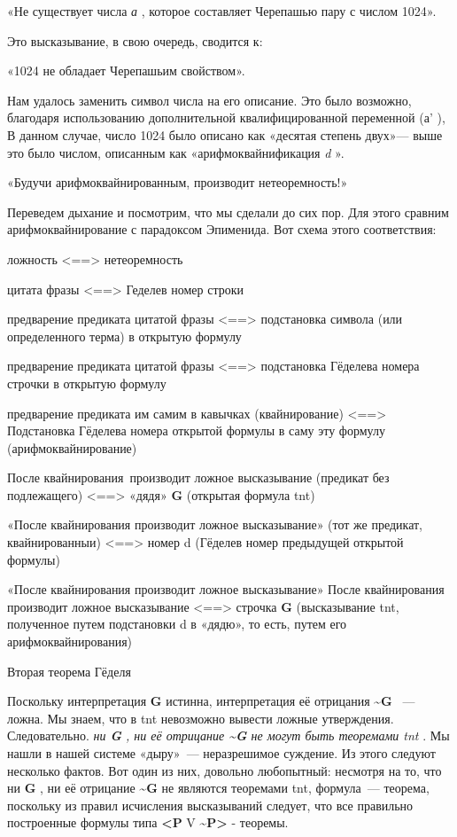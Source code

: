 \documentclass[../main.tex]{subfiles}
\begin{document}
«Не существует числа \emph{а} , которое составляет Черепашью пару с числом 1024».

Это высказывание, в свою очередь, сводится к:

«1024 не обладает Черепашьим свойством».

Нам удалось заменить символ числа на его описание. Это было возможно, благодаря использованию дополнительной квалифицированной переменной (а' ), В данном случае, число 1024 было описано как «десятая степень двух»--- выше это было числом, описанным как «арифмоквайнификация \emph{d} ».

«Будучи арифмоквайнированным, производит нетеоремность!»

Переведем дыхание и посмотрим, что мы сделали до сих пор. Для этого сравним арифмоквайнирование с парадоксом Эпименида. Вот схема этого соответствия:

ложность \textless==\textgreater{} нетеоремность

цитата фразы \textless==\textgreater{} Геделев номер строки

предварение предиката цитатой фразы \textless==\textgreater{} подстановка символа (или определенного терма) в открытую формулу

предварение предиката цитатой фразы \textless==\textgreater{} подстановка Гёделева номера строчки в открытую формулу

предварение предиката им самим в кавычках (квайнирование) \textless==\textgreater{} Подстановка Гёделева номера открытой формулы в саму эту формулу (арифмоквайнирование)

После квайнирования~производит ложное высказывание (предикат без подлежащего) \textless==\textgreater{} «дядя» \textbf{G} (открытая формула \acs{tnt})

«После квайнирования производит ложное высказывание» (тот же предикат, квайнированныи) \textless==\textgreater{} номер d (Гёделев номер предыдущей открытой формулы)

«После квайнирования производит ложное высказывание» После квайнирования производит ложное высказывание \textless==\textgreater{} строчка \textbf{G} (высказывание \acs{tnt}, полученное путем подстановки d в «дядю», то есть, путем его арифмоквайнирования)

Вторая теорема Гёделя

Поскольку интерпретация \textbf{G} истинна, интерпретация её отрицания \textbf{\textasciitilde G} ~--- ложна. Мы знаем, что в \acs{tnt} невозможно вывести ложные утверждения. Следовательно. \emph{ни \textbf{G} , ни её отрицание \textbf{\textasciitilde G} не могут быть теоремами \acs{tnt}} . Мы нашли в нашей системе «дыру»~--- неразрешимое суждение. Из этого следуют несколько фактов. Вот один из них, довольно любопытный: несмотря на то, что ни \textbf{G} , ни её отрицание \textbf{\textasciitilde G} не являются теоремами \acs{tnt}, формула~--- теорема, поскольку из правил исчисления высказываний следует, что все правильно построенные формулы типа \textbf{\textless P} V \textbf{\textasciitilde P\textgreater{}} - теоремы.
\end{document}
